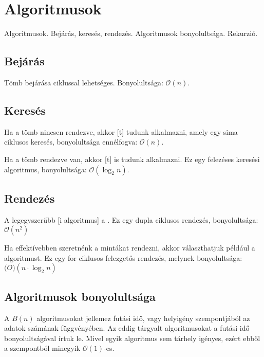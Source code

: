 \documentclass[../../main.tex]{subfiles}
\begin{document}
\section{Algoritmusok}

\begin{fulltheorem}
	Algoritmusok. Bejárás, keresés, rendezés.
	Algoritmusok bonyolultsága. Rekurzió.
\end{fulltheorem}

\subsection{Bejárás}

Tömb bejárása  ciklussal lehetséges. Bonyolultsága: $\mathcal{O}(n)$.

\subsection{Keresés}

Ha a tömb nincsen rendezve, akkor [t] tudunk
alkalmazni, amely egy sima  ciklusos keresés, bonyolultsága
ennélfogva: $\mathcal{O}(n)$.

Ha a tömb rendezve van, akkor [t] is tudunk alkalmazni.
Ez egy felezéses keresési algoritmus, bonyolultsága: $\mathcal{O}(\log_2n)$.

\subsection{Rendezés}

A legegyszerűbb [i algoritmus] a .
Ez egy dupla  ciklusos rendezés, bonyolultsága: $\mathcal{O}(n^2)$

Ha effektívebben szeretnénk a mintákat rendezni, akkor választhatjuk
például a  algoritmust. Ez egy for ciklusos felezgetős
rendezés, melynek bonyolultsága: $\mathcal(O)(n \cdot \log_2n)$

\subsection{Algoritmusok bonyolultsága}

A $B(n)$  algoritmusokat jellemez futási idő, vagy
helyigény szempontjából az adatok számának függvényében. Az eddig tárgyalt
algoritmusokat a futási idő bonyolultságával írtuk le. Mivel egyik
algoritmus sem tárhely igényes, ezért ebből a szempontból minegyik
$\mathcal{O}(1)$-es.
\end{document}
